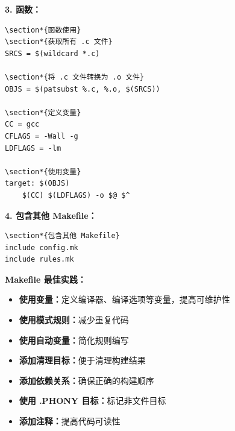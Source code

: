 \documentclass[12pt,UTF8]{ctexbook}
\begin{document}
\textbf{3. 函数：}
\begin{verbatim}
\section*{函数使用}
\section*{获取所有 .c 文件}
SRCS = $(wildcard *.c)

\section*{将 .c 文件转换为 .o 文件}
OBJS = $(patsubst %.c, %.o, $(SRCS))

\section*{定义变量}
CC = gcc
CFLAGS = -Wall -g
LDFLAGS = -lm

\section*{使用变量}
target: $(OBJS)
	$(CC) $(LDFLAGS) -o $@ $^
\end{verbatim}

\textbf{4. 包含其他 Makefile：}
\begin{verbatim}
\section*{包含其他 Makefile}
include config.mk
include rules.mk
\end{verbatim}

\textbf{Makefile 最佳实践：}
\begin{itemize}
    \item \textbf{使用变量：}定义编译器、编译选项等变量，提高可维护性
    \item \textbf{使用模式规则：}减少重复代码
    \item \textbf{使用自动变量：}简化规则编写
    \item \textbf{添加清理目标：}便于清理构建结果
    \item \textbf{添加依赖关系：}确保正确的构建顺序
    \item \textbf{使用 .PHONY 目标：}标记非文件目标
    \item \textbf{添加注释：}提高代码可读性
\end{itemize}
\end{document}
